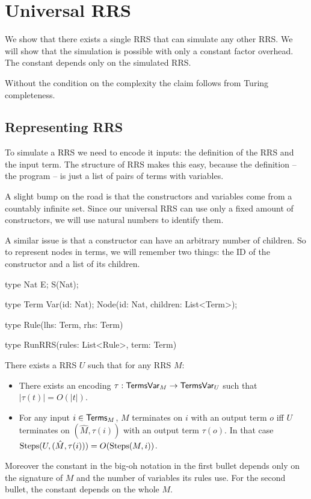 \documentclass[11pt]{article}
\begin{document}
\section{Universal RRS}

We show that there exists a single RRS that can simulate any other RRS.
We will show that the simulation is possible with only a constant factor overhead.
The constant depends only on the simulated RRS.

Without the condition on the complexity the claim follows from Turing completeness.

\subsection{Representing RRS}

To simulate a RRS we need to encode it inputs: the definition of the RRS
and the input term. The structure of RRS makes this easy, because the definition
-- the program -- is just a list of pairs of terms with variables.

A slight bump on the road is that the constructors and variables come from
a countably infinite set. Since our universal RRS can use only a fixed amount
of constructors, we will use natural numbers to identify them.

A similar issue is that a constructor can have an arbitrary number of children.
So to represent nodes in terms, we will remember two things: the ID of the
constructor and a list of its children.

\begin{rrscode}
type Nat {
    E;
    S(Nat);
}

type Term {
    Var(id: Nat);
    Node(id: Nat, children: List<Term>);
}

type Rule(lhs: Term, rhs: Term)

type RunRRS(rules: List<Rule>, term: Term)
\end{rrscode}

\begin{theorem}[URRS]
There exists a RRS $U$ such that for any RRS $M$:

\begin{itemize}
  \item There exists an encoding $\tau: \mathsf{TermsVar}_M \to \mathsf{TermsVar}_U$ such that
    $|\tau(t)| = O(|t|)$.
  \item For any input $i \in \mathsf{Terms}_M$, $M$ terminates on $i$ with an output
    term $o$ iff $U$ terminates on $(\hat{M}, \tau(i))$ with an output term
    $\tau(o)$. In that case $\mathrm{Steps}(U, (\hat{M}, \tau(i))) = O(\mathrm{Steps}(M, i))$.
\end{itemize}

Moreover the constant in the big-oh notation in the first bullet depends
only on the signature of $M$ and the number of variables its rules use.
For the second bullet, the constant depends on the whole $M$.

\end{theorem}
\end{document}
